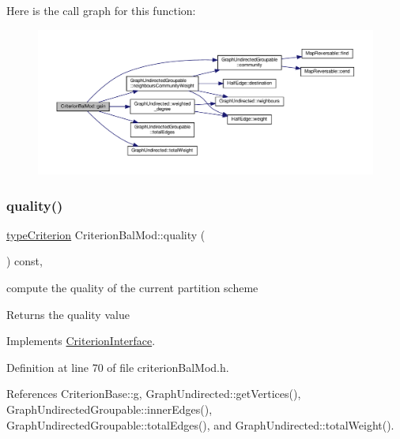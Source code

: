 Here is the call graph for this function\+:
\nopagebreak
\begin{figure}[H]
\begin{center}
\leavevmode
\includegraphics[width=350pt]{classCriterionBalMod_acf5001622eb8c495a5d5e8f044c22395_cgraph}
\end{center}
\end{figure}
\mbox{\label{classCriterionBalMod_a87c0ccb5e2a851420dc82bd23cc31716}} 
\subsubsection{\texorpdfstring{quality()}{quality()}}
{\footnotesize\ttfamily \hyperlink{criterionInterface_8h_af71ff22f6355fd69a4a62104bfd59a83}{type\+Criterion} Criterion\+Bal\+Mod\+::quality (\begin{DoxyParamCaption}{ }\end{DoxyParamCaption}) const\hspace{0.3cm}{\ttfamily [inline]}, {\ttfamily [virtual]}}

compute the quality of the current partition scheme

\begin{DoxyReturn}{Returns}
the quality value 
\end{DoxyReturn}


Implements \hyperlink{classCriterionInterface_a5d287dc7755f7ce7d6a3d91f0d8fa5de}{Criterion\+Interface}.



Definition at line 70 of file criterion\+Bal\+Mod.\+h.



References Criterion\+Base\+::g, Graph\+Undirected\+::get\+Vertices(), Graph\+Undirected\+Groupable\+::inner\+Edges(), Graph\+Undirected\+Groupable\+::total\+Edges(), and Graph\+Undirected\+::total\+Weight().



